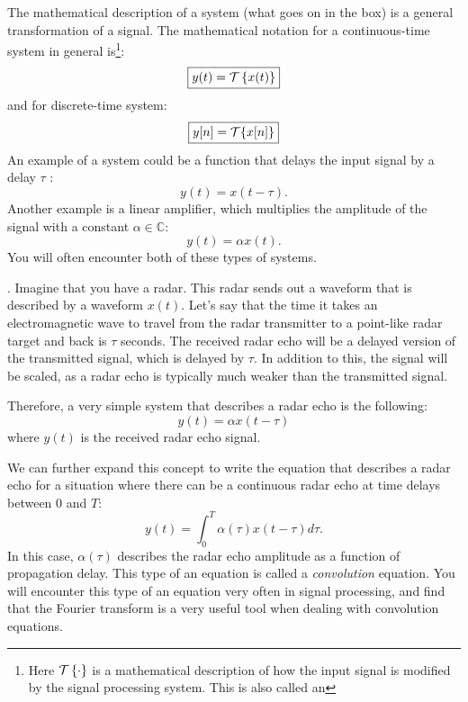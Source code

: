 The mathematical description of a system (what goes on in the box) is
a general transformation of a signal. The mathematical notation for a
continuous-time system in general is\footnote{Here $\spop$ is a
  mathematical description of how the input signal is modified by the
  signal processing system. This is also called an
  }:
\begin{equation}
\boxed{
y(t) = \spop[x(t)]
}
\end{equation}
and for discrete-time system:
\begin{equation}
\boxed{
y[n] = \spopb\{x[n]\}
}
\end{equation}
An example of a system could be a function that delays the input
signal by a delay $\tau$ :
\begin{equation}
y(t) = x(t-\tau).
\end{equation}
Another example is a linear amplifier, which multiplies the amplitude
of the signal with a constant $\alpha \in \mathbb{C}$:
\begin{equation}
y(t) = \alpha x(t).
\end{equation}
You will often encounter both of these types of systems.

. Imagine that you have a radar. This radar sends out
a waveform that is described by a waveform $x(t)$. Let's say that the
time it takes an electromagnetic wave to travel from the radar
transmitter to a point-like radar target and back is $\tau$
seconds. The received radar echo will be a delayed version of the
transmitted signal, which is delayed by $\tau$. In addition to this,
the signal will be scaled, as a radar echo is typically much weaker
than the transmitted signal.

Therefore, a very simple system that describes a radar echo is the
following:
\begin{equation}
y(t) = \alpha x(t-\tau)
\end{equation}
where $y(t)$ is the received radar echo signal.

We can further expand this concept to write the equation that
describes a radar echo for a situation where there can be a continuous
radar echo at time delays between $0$ and $T$:
\begin{equation}
y(t) = \int_0^T \alpha(\tau) x(t-\tau) d\tau.
\end{equation}
In this case, $\alpha(\tau)$ describes the radar echo amplitude as a
function of propagation delay. This type of an equation is called
a \emph{convolution} equation. You will encounter
this type of an equation very often in signal processing, and find
that the Fourier transform is a very useful tool when dealing with
convolution equations.

